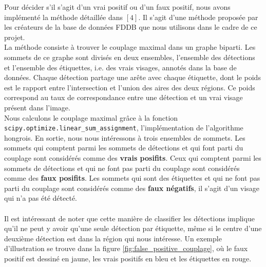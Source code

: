 \documentclass[a4paper,11pt]{article}
\begin{document}
        Pour décider s'il s'agit d'un vrai positif ou d'un faux positif, nous avons implémenté la méthode détaillée dans $[4]$.
        Il s'agit d'une méthode proposée par les créateurs de la base de données FDDB que nous utilisons dans le cadre de ce projet.
        \\
        La méthode consiste à trouver le couplage maximal dans un graphe biparti.
        Les sommets de ce graphe sont divisés en deux ensembles, l'ensemble des détections et l'ensemble des étiquettes, i.e. des vrais visages, annotés dans la base de données.
        Chaque détection partage une arête avec chaque étiquette, dont le poids est le rapport entre l'intersection et l'union des aires des deux régions.
        Ce poids correspond au taux de correspondance entre une détection et un vrai visage présent dans l'image.
        \\
        Nous calculons le couplage maximal grâce à la fonction \verb!scipy.optimize.linear_sum_assignment!, l'implémentation de l'algorithme hongrois.
        En sortie, nous nous intéressons à trois ensembles de sommets. 
        Les sommets qui comptent parmi les sommets de détections et qui font parti du couplage sont considérés comme des {\bf vrais posifits}.
        Ceux qui comptent parmi les sommets de détections et qui ne font pas parti du couplage sont considérés comme des {\bf faux posifits}.
        Les sommets qui sont des étiquettes et qui ne font pas parti du couplage sont considérés comme des {\bf faux négatifs}, il s'agit d'un visage qui n'a pas été détecté.
        \\
        \\
        Il est intéressant de noter que cette manière de classifier les détections implique qu'il ne peut y avoir qu'une seule détection par étiquette, même si le centre d'une deuxième détection est dans la région qui nous intéresse.
        Un exemple d'illustration se trouve dans la figure \ref{fig:false_positive_couplage}, où le faux positif est dessiné en jaune, les vrais positifs en bleu et les étiquettes en rouge.
\end{document}
